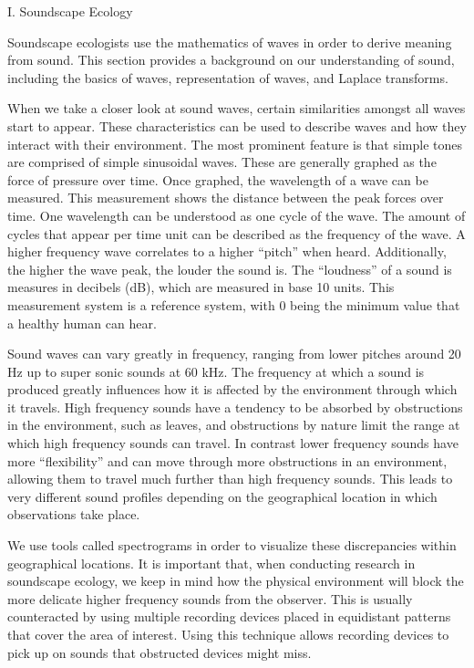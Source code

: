 \begin{center}
I. Soundscape Ecology
\end{center}
\begin{flushleft}
\setlength{\parindent}{0.125in}
Soundscape ecologists use the mathematics of waves in order to derive meaning from sound. This section provides a background on our understanding of sound, including the basics of waves, representation of waves, and Laplace transforms.\par

When we take a closer look at sound waves, certain similarities amongst all waves start to appear. These characteristics can be used to describe waves and how they interact with their environment. The most prominent feature is that simple tones are comprised of simple sinusoidal waves. These are generally graphed as the force of pressure over time. Once graphed, the wavelength of a wave can be measured. This measurement shows the distance between the peak forces over time. One wavelength can be understood as one cycle of the wave. The amount of cycles that appear per time unit can be described as the frequency of the wave. A higher frequency wave correlates to a higher ``pitch'' when heard. Additionally, the higher the wave peak, the louder the sound is. The ``loudness'' of a sound is measures in decibels (dB), which are measured in base 10 units. This measurement system is a reference system, with 0 being the minimum value that a healthy human can hear.\cite{villanueva}\par

Sound waves can vary greatly in frequency, ranging from lower pitches around 20 Hz up to super sonic sounds at 60 kHz. The frequency at which a sound is produced greatly influences how it is affected by the environment through which it travels. High frequency sounds have a tendency to be absorbed by obstructions in the environment, such as leaves, and obstructions by nature limit the range at which high frequency sounds can travel. In contrast lower frequency sounds have more ``flexibility'' and can move through more obstructions in an environment, allowing them to travel much further than high frequency sounds. This leads to very different sound profiles depending on the geographical location in which observations take place.\par

We use tools called spectrograms in order to visualize these discrepancies within geographical locations. It is important that, when conducting research in soundscape ecology, we keep in mind how the physical environment will block the more delicate higher frequency sounds from the observer. This is usually counteracted by using multiple recording devices placed in equidistant patterns that cover the area of interest. Using this technique allows recording devices to pick up on sounds that obstructed devices might miss.\par


\end{flushleft}
